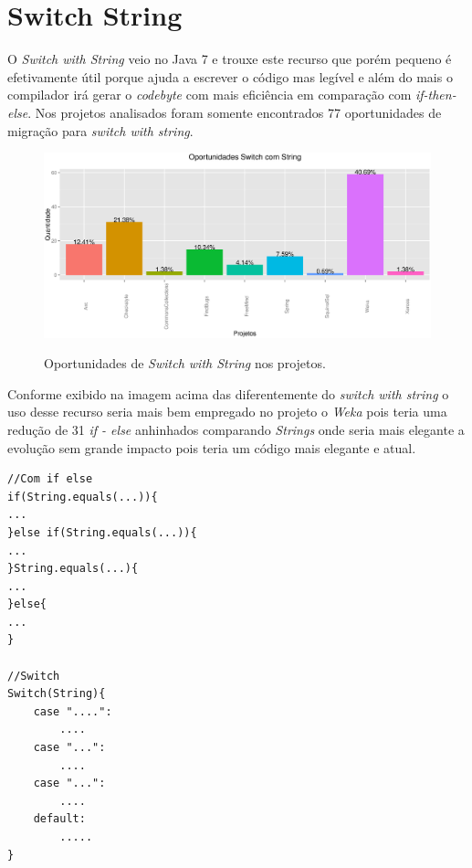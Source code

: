 \section{Switch String}

O \textit{Switch with String} veio no Java 7 e trouxe este recurso que porém pequeno é efetivamente útil porque ajuda a escrever o código mas legível e além do mais o compilador 
irá gerar o \textit{codebyte} com mais eficiência em comparação com \textit{if-then-else}. Nos projetos analisados foram somente encontrados 77 oportunidades de migração para \textit{switch with string}.

\begin{figure}[h]
	\center
	\includegraphics[scale=0.5]{Imagens/oportunidadesSwitchString}
	\label{fig:Switch with String}
	\caption{Oportunidades de \textit{Switch with String} nos projetos.}
\end{figure}


Conforme exibido na imagem acima das diferentemente do \textit{switch with string} o uso desse recurso seria mais bem empregado no projeto o \textit{Weka} pois teria uma redução de 31 \textit{if - else} anhinhados comparando \textit{Strings} onde seria mais elegante a evolução sem grande impacto pois teria um código mais elegante e atual.

\begin{lstlisting}
//Com if else
if(String.equals(...)){
...
}else if(String.equals(...)){
...
}String.equals(...){
...
}else{
...
}

//Switch
Switch(String){
	case "....":
		....
	case "...":
		....
	case "...":
		....
	default:
		.....
}
\end{lstlisting}